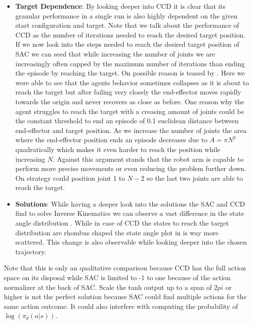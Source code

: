 \begin{itemize}
    \item \textbf{Target Dependence}: By looking deeper into CCD it is clear that its granular performance in a single run is also highly dependent on the given start configuration and target.  Note that we talk about the performance of CCD as the number of iterations needed to reach the desired target position. If we now look into the steps needed to reach the desired target position of SAC we can seed that while increasing the number of joints we are increasingly often capped by the maximum number of iterations than ending the episode by reaching the target. On possible reason is teased by \figref{} . Here we were able to see that the agents behavior sometimes collapses as it is about to reach the target but after failing very closely the end-effector moves rapidly towards the origin and never recovers as close as before. One reason why the agent struggles to reach the target with a creasing amount of joints could be the constant threshold to end an episode of 0.1 euclidean distance between end-effector and target position. As we increase the number of joints the area where the end-effector position ends an episode decreases due to $A = \pi N^2$ quadratically which makes it even harder to reach the position while increasing $N$. Against this argument stands that the robot arm is capable to perform more precise movements or even reducing the problem further down. On strategy could position joint 1 to $N - 2$ so the last two joints are able to reach the target. 
    \item \textbf{Solutions}: While having a deeper look into the solutions the SAC and CCD find to solve Inverse Kinematics we can observe a vast difference in the state angle distribution . While in case of CCD the states to reach the target distribution are rhombus shaped the state angle plot in \figref{} is way more scattered. This change is also observable while looking deeper into the chosen trajectory. 
\end{itemize}

Note that this is only an qualitative comparison because CCD has the full action space on its disposal while SAC is limited to -1 to one because of the action normalizer at the back of SAC. Scale the tanh output up to a span of $2pi$ or higher is not the perfect solution because SAC could find multiple actions for the same action outcome. It could also interfere with computing the probability of $\log(\pi_\theta(a|s))$.   

